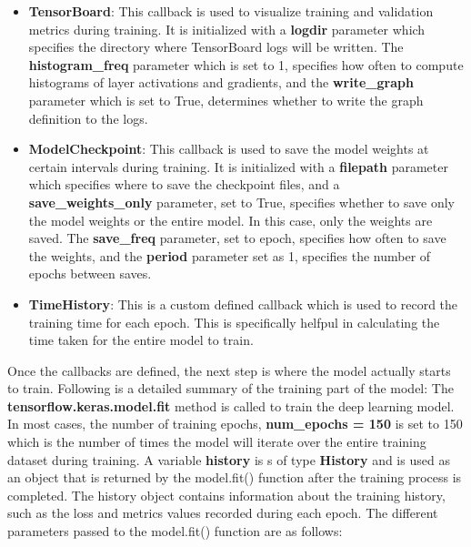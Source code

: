 \begin{itemize}
    \item \textbf{TensorBoard}: This callback is used to visualize training and validation metrics during training. It is initialized with a \textbf{logdir} parameter which specifies the directory where TensorBoard logs will be written. The \textbf{histogram\_freq} parameter which is set to 1, specifies how often to compute histograms of layer activations and gradients, and the \textbf{write\_graph} parameter which is set to True, determines whether to write the graph definition to the logs.
    \item \textbf{ModelCheckpoint}: This callback is used to save the model weights at certain intervals during training. It is initialized with a \textbf{filepath} parameter which specifies where to save the checkpoint files, and a \textbf{save\_weights\_only} parameter, set to True, specifies whether to save only the model weights or the entire model. In this case, only the weights are saved. The \textbf{save\_freq} parameter, set to epoch, specifies how often to save the weights, and the \textbf{period} parameter set as 1, specifies the number of epochs between saves.
    \item \textbf{TimeHistory}: This is a custom defined callback which is used to record the training time for each epoch. This is specifically helfpul in calculating the time taken for the entire model to train.
\end{itemize}

Once the callbacks are defined, the next step is where the model actually starts to train. Following is a detailed summary of the training part of the model:
The \textbf{tensorflow.keras.model.fit} \cite{tensorflowTfkerasModelTensorFlowfit} method is called to train the deep learning model. In most cases, the number of training epochs, \textbf{num\_epochs = 150} is set to 150 which is the number of times the model will iterate over the entire training dataset during training.
A variable \textbf{history} is s of type \textbf{History} and is used as an object that is returned by the model.fit() function after the training process is completed. The history object contains information about the training history, such as the loss and metrics values recorded during each epoch. The different parameters passed to the model.fit() function are as follows:

